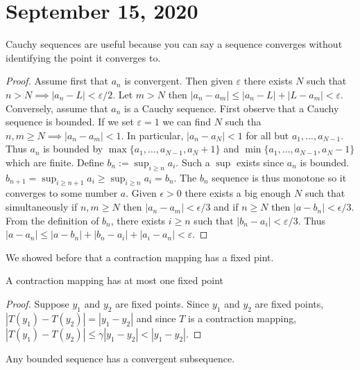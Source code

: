 \documentclass{article}
\newcommand{\eps}{\varepsilon}
\begin{document}
\section{September 15, 2020}
\begin{fact}
Cauchy sequences are useful because you can say a sequence converges without identifying the point it converges to.
\end{fact}
\begin{proof}
Assume first that $a_n$ is convergent. Then given $\eps$ there exists $N$ such that $n>N\implies |a_n-L|<\eps/2$. Let $m>N$ then $|a_n-a_m|\leq|a_n-L|+|L-a_m|<\eps$.\\
Conversely, assume that $a_n$ is a Cauchy sequence. First observe that a Cauchy sequence is bounded. If we set $\eps=1$ we can find $N$ such tha $n,m\geq N\implies |a_n-a_m|<1$. In particular, $|a_n-a_N|<1$ for all but $a_1,...,a_{N-1}$. Thus $a_n$ is bounded by $\max\{a_1,...,a_{N-1},a_N+1\}$ and $\min\{a_1,...,a_{N-1},a_N-1\}$ which are finite. Define $b_n:=\sup_{i\geq n}a_i$. Such a $\sup$ exists since $a_n$ is bounded. $b_{n+1}=\sup_{i\geq n+1}a_i\geq\sup_{i\geq n}a_i=b_n$. The $b_n$ sequence is thus monotone so it converges to some number $a$. Given $\epsilon>0$ there exists a big enough $N$ such that simultaneously if $n,m\geq N$ then $|a_n-a_m|<\epsilon/3$ and if $n\geq N$ then $|a-b_n|<\epsilon/3$. From the definition of $b_n$, there exists $i\geq n$ such that $|b_n-a_i|<\eps/3$. Thus $|a-a_n|\leq|a-b_n|+|b_n-a_i|+|a_i-a_n|<\eps$.
\end{proof}
We showed before that a contraction mapping has a fixed pint.
\begin{proposition}
A contraction mapping has at most one fixed point
\end{proposition}
\begin{proof}
Suppose $y_1$ and $y_2$ are fixed points. Since $y_1$ and $y_2$ are fixed points, $|T(y_1)-T(y_2)|=|y_1-y_2|$ and since $T$ is a contraction mapping, $|T(y_1)-T(y_2)|\leq\gamma|y_1-y_2|<|y_1-y_2|$.
\end{proof}
\begin{theorem}
Any bounded sequence has a convergent subsequence.
\end{theorem}
\end{document}

